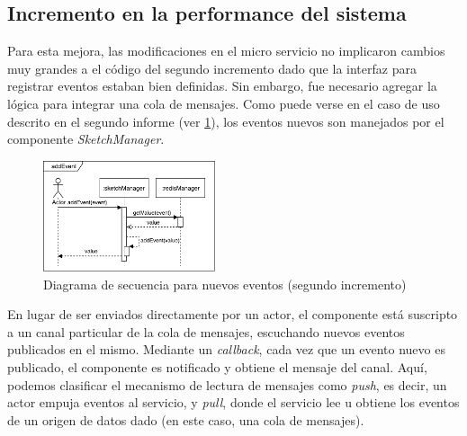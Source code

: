 \documentclass[a4paper,10pt, oneside]{article}
\begin{document}
\subsection{Incremento en la performance del sistema}
Para esta mejora, las modificaciones en el micro servicio no implicaron cambios muy grandes a el código del segundo incremento dado que la interfaz para registrar eventos estaban bien definidas. Sin embargo, fue necesario agregar la lógica para integrar una cola de mensajes. Como puede verse en el caso de uso descrito en el segundo informe (ver \ref{fig:SecDiagResourceAddEvent}), los eventos nuevos son manejados por el componente \textit{SketchManager}.

\begin{figure}[htbp]
	\centering
	\includegraphics[width=0.45\textwidth]{../informe_2/graph/SecDiag-resourceAddEvent.pdf}
	\caption{Diagrama de secuencia para nuevos eventos (segundo incremento)}
	\label{fig:SecDiagResourceAddEvent}
\end{figure}

En lugar de ser enviados directamente por un actor, el componente está suscripto a un canal particular de la cola de mensajes, escuchando nuevos eventos publicados en el mismo. Mediante un \textit{callback}, cada vez que un evento nuevo es publicado, el componente es notificado y obtiene el mensaje del canal. Aquí, podemos clasificar el mecanismo de lectura de mensajes como \textit{push}, es decir, un actor empuja eventos al servicio, y \textit{pull}, donde el servicio lee u obtiene los eventos de un origen de datos dado (en este caso, una cola de mensajes).

\newpage
\nocite{*}
\printbibliography
\end{document}

